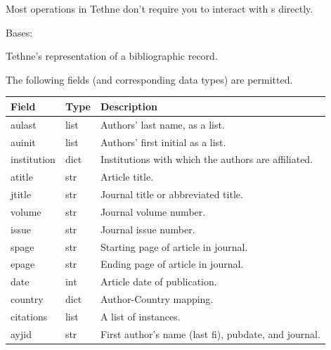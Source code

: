 \documentclass[letterpaper,10pt,english]{sphinxmanual}
\begin{document}
Most operations in Tethne don't require you to interact with {\hyperref[tethne.classes.paper:tethne.classes.paper.Paper]{}}s
directly.

\begin{fulllineitems}
\label{tethne.classes.paper:tethne.classes.paper.Paper}
Bases: 

Tethne's representation of a bibliographic record.

The following fields (and corresponding data types) are permitted.

\begin{tabulary}{\linewidth}{|L|L|L|}
\hline
\textsf{\relax 
Field
} & \textsf{\relax 
Type
} & \textsf{\relax 
Description
}\\
\hline
aulast
 & 
list
 & 
Authors' last name, as a list.
\\

auinit
 & 
list
 & 
Authors' first initial as a list.
\\

institution
 & 
dict
 & 
Institutions with which the authors are affiliated.
\\

atitle
 & 
str
 & 
Article title.
\\

jtitle
 & 
str
 & 
Journal title or abbreviated title.
\\

volume
 & 
str
 & 
Journal volume number.
\\

issue
 & 
str
 & 
Journal issue number.
\\

spage
 & 
str
 & 
Starting page of article in journal.
\\

epage
 & 
str
 & 
Ending page of article in journal.
\\

date
 & 
int
 & 
Article date of publication.
\\

country
 & 
dict
 & 
Author-Country mapping.
\\

citations
 & 
list
 & 
A list of {\hyperref[tethne.classes.paper:tethne.classes.paper.Paper]{}} instances.
\\

ayjid
 & 
str
 & 
First author's name (last fi), pubdate, and journal.
\\


\end{tabulary}
\end{fulllineitems}
\end{document}
